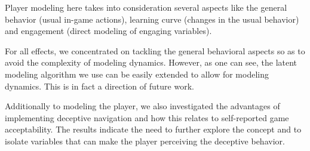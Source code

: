 

Player modeling here takes into consideration several aspects like the general behavior (usual in-game actions), learning curve (changes in the usual behavior) and engagement (direct modeling of engaging variables). 

For all effects, we concentrated on tackling the general behavioral aspects so as to avoid the complexity of modeling dynamics. However, as one can see, the latent modeling algorithm we use can be easily extended to allow for modeling dynamics. This is in fact a direction of future work.

Additionally to modeling the player, we also investigated the advantages of implementing deceptive navigation and how this relates to self-reported game acceptability. The results indicate the need to further explore the concept and to isolate variables that can make the player perceiving the deceptive behavior. 
